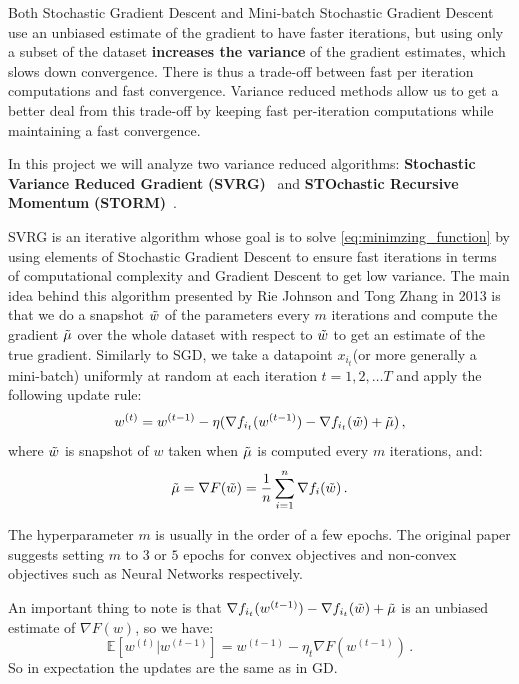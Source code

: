 \documentclass[a4paper,11pt,oneside]{report}
\begin{document}
Both Stochastic Gradient Descent and Mini-batch Stochastic Gradient Descent use an unbiased estimate of the gradient to have faster iterations, but using only a subset of the dataset \textbf{increases the variance} of the gradient estimates, which slows down convergence. There is thus a trade-off between fast per iteration computations and fast convergence. Variance reduced methods allow us to get a better deal from this trade-off by keeping fast per-iteration computations while maintaining a fast convergence.

In this project we will analyze two variance reduced algorithms: \textbf{Stochastic Variance Reduced Gradient} \textbf{(SVRG)}~\cite{NIPS2013_ac1dd209} and \textbf{STOchastic Recursive Momentum} \textbf{(STORM)}~\cite{Cutkosky2019storm}. 

SVRG is an iterative algorithm whose goal is to solve \autoref{eq:minimzing_function} by using elements of Stochastic Gradient Descent to ensure fast iterations in terms of computational complexity and Gradient Descent to get low variance. The main idea behind this algorithm presented by Rie Johnson and Tong Zhang in 2013 is that we do a snapshot $\Tilde{w}$ of the parameters every $m$ iterations and compute the gradient $\Tilde{\mu}$ over the whole dataset with respect to $\Tilde{w}$ to get an estimate of the true gradient. Similarly to SGD, we take a datapoint $x_{i_t}$(or more generally a mini-batch) uniformly at random at each iteration $t=1,2,\dots T$ and apply the following update rule:
\begin{equation}\label{eq:updateSVRG}
    w^{(t)} = w^{(t-1)} -\eta(\nabla f_{i_t}(w^{(t-1)}) - \nabla f_{i_t}(\Tilde{w}) + \Tilde{\mu})\,,
\end{equation}
where $\Tilde{w}$ is snapshot of $w$ taken when $\Tilde{\mu}$ is computed every $m$ iterations, and:
\begin{equation}\label{eq:snapshotGradientSVRG}
    \Tilde{\mu} = \nabla F(\Tilde{w}) = \frac{1}{n}\sum_{i=1}^n \nabla f_i(\Tilde{w})\,.
\end{equation}

The hyperparameter $m$ is usually in the order of a few epochs. The original paper suggests setting $m$ to $3$ or $5$ epochs for convex objectives and non-convex objectives such as Neural Networks respectively. 

An important thing to note is that $\nabla f_{i_t}(w^{(t-1)}) - \nabla f_{i_t}(\Tilde{w}) + \Tilde{\mu}$ is an unbiased estimate of $\nabla F(w)$, so we have:
\begin{equation}
    \mathbb{E}[w^{(t)} | w^{(t-1)}] = w^{(t-1)}-\eta_t \nabla F(w^{(t-1)})\,.
\end{equation}
So in expectation the updates are the same as in GD. 
\end{document}
